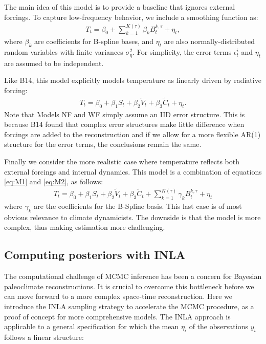 \documentclass[12pt]{amsart}
\theoremstyle{plain}
\theoremstyle{definition}
\theoremstyle{remark}
\newcommand{\lb}[1]{\color{MidnightBlue}\textbf{[LB: #1]}\normalcolor}
\newcommand{\jeg}[1]{\color{ProcessBlue}\textbf{[JEG: #1]}\normalcolor}
\begin{document}
The main idea of this model is to provide a baseline that ignores external forcings. To capture low-frequency behavior, we include a smoothing function as: 
  \begin{align}\label{eq:M1}
    T_t=\beta_0+\sum_{k=1}^{K(\tau)}\beta_k B_t^{k,\tau}+\eta_t,
  \end{align}
where $\beta_k$ are coefficients for B-spline bases, and
$\eta_t$ are also normally-distributed random variables with finite variances
$\sigma^2_{\eta}$. For simplicity, the error terms $\epsilon^i_t$ and $\eta_t$
are assumed to be independent.  

Like B14, this model explicitly models temperature as linearly driven by radiative forcing:
  \begin{align}\label{eq:M2}
    T_t=\beta_0+\beta_1S_t+\beta_2\tilde V_t+\beta_3\tilde C_t+\eta_t.
  \end{align}
Note that Models NF and WF simply assume an IID error structure. This is because B14 
found that complex error structures make little difference when forcings are
added to the reconstruction and if we allow for a more flexible AR(1) structure for the error terms, the conclusions remain the same.

Finally we consider the more realistic case where temperature reflects both external forcings and internal dynamics. This model is a combination of equations \eqref{eq:M1} and \eqref{eq:M2}, as follows:
  \begin{align}\label{eq:M3}
    T_t=\beta_0+\beta_1S_t+\beta_2\tilde V_t+\beta_3\tilde C_t+\sum_{k=1}^{K(\tau)}\gamma_k B_t^{k,\tau}+\eta_t
  \end{align}
  where $\gamma_k$ are the coefficients for the B-Spline basis. %
  This last case is of most obvious relevance to climate dynamicists. The downside is that the model is more complex, thus making estimation more challenging.

\subsection{Computing posteriors with INLA}

The computational challenge of MCMC inference has been a concern for Bayesian paleoclimate reconstructions. It is crucial to overcome this  bottleneck before we can move forward to a more complex space-time reconstruction. Here we introduce the INLA sampling strategy to accelerate the MCMC procedure, as a proof of concept for more comprehensive models. The INLA approach is applicable to a general specification for which the mean $\eta_i$ of the observations $y_i$ follows a linear structure:
\end{document}
